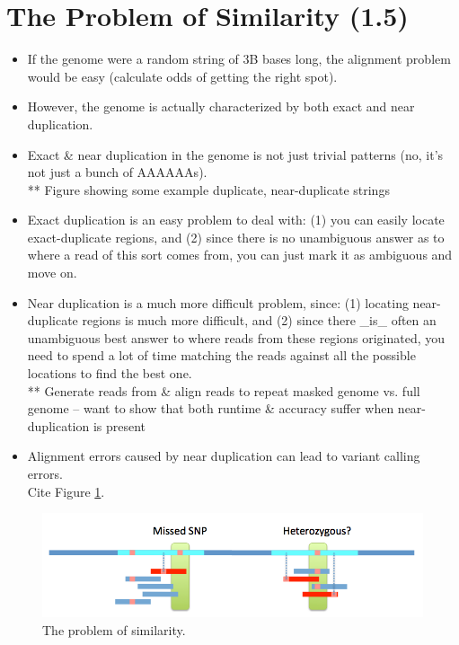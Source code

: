 \documentclass[10pt]{article}
\begin{document}
\section{The Problem of Similarity (1.5)}
\begin{itemize}
\item{If the genome were a random string of 3B bases long, the alignment problem would be easy (calculate odds of getting the right spot).}
\item{However, the genome is actually characterized by both exact and near duplication.}
\item{Exact \& near duplication in the genome is not just trivial patterns (no, it's not just a bunch of AAAAAAs).}\\
** Figure showing some example duplicate, near-duplicate strings
\item{Exact duplication is an easy problem to deal with:  (1) you can easily locate exact-duplicate regions, and (2) since there is no unambiguous answer as to where a read of this sort comes from, you can just mark it as ambiguous and move on.}
\item{Near duplication is a much more difficult problem, since:  (1) locating near-duplicate regions is much more difficult, and (2) since there \_is\_ often an unambiguous best answer to where reads from these regions originated, you need to spend a lot of time matching the reads against all the possible locations to find the best one.}\\
** Generate reads from \& align reads to repeat masked genome vs. full genome -- want to show that both runtime \& accuracy suffer when near-duplication is present
\item{Alignment errors caused by near duplication can lead to variant calling errors.}\\
Cite Figure \ref{fig:problemOfSimilarity}.
\end{itemize}
\begin{figure}
\centering
\includegraphics[scale=0.5]{problemOfSimilarity}
\caption{The problem of similarity.}
\label{fig:problemOfSimilarity}
\end{figure}
\end{document}
